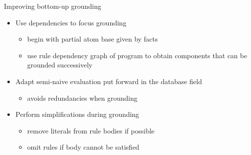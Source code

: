 \begin{frame}{Improving bottom-up grounding}
  \bigskip
  \begin{itemize}
    \item Use dependencies to \alert{focus} grounding
          \begin{itemize}\normalsize
            \item begin with partial atom base given by facts
            \item use rule dependency graph of program to obtain \alert{components} that can be \alert{grounded successively}
          \end{itemize}
          \medskip
    \item Adapt \alert{semi-naive evaluation} put forward in the database field
          \begin{itemize}\normalsize
            \item avoids redundancies when grounding
          \end{itemize}
          \medskip
    \item Perform \alert{simplifications} during grounding
          \begin{itemize}\normalsize
            \item remove literals from rule bodies if possible
            \item omit rules if body cannot be satisfied
          \end{itemize}
  \end{itemize}
\end{frame}

